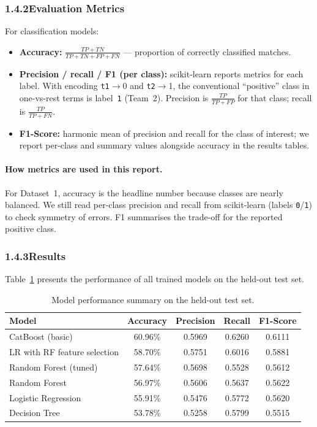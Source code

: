 \documentclass[12pt,a4paper]{article}
\begin{document}
\subsubsection{1.4.2\quad Evaluation Metrics}

For classification models:

\begin{itemize}[leftmargin=1.5em]
    \item \textbf{Accuracy:} $\frac{TP + TN}{TP + TN + FP + FN}$ --- proportion of correctly classified matches.
    \item \textbf{Precision / recall / F1 (per class):} scikit-learn reports metrics for each label. With encoding \texttt{t1}$\rightarrow$0 and \texttt{t2}$\rightarrow$1, the conventional ``positive'' class in one-vs-rest terms is label~\texttt{1} (Team~2). Precision is $\frac{TP}{TP+FP}$ for that class; recall is $\frac{TP}{TP+FN}$.
    \item \textbf{F1-Score:} harmonic mean of precision and recall for the class of interest; we report per-class and summary values alongside accuracy in the results tables.
\end{itemize}

\paragraph{How metrics are used in this report.}
For Dataset~1, accuracy is the headline number because classes are nearly balanced. We still read per-class precision and recall from scikit-learn (labels \texttt{0}/\texttt{1}) to check symmetry of errors. F1 summarises the trade-off for the reported positive class.

\subsubsection{1.4.3\quad Results}

Table~\ref{tab:results} presents the performance of all trained models on the held-out test set.

\begin{table}[H]
\centering
\caption{Model performance summary on the held-out test set.}
\label{tab:results}
\begin{tabular}{lcccc}
\toprule
\textbf{Model} & \textbf{Accuracy} & \textbf{Precision} & \textbf{Recall} & \textbf{F1-Score} \\
\midrule
CatBoost (basic)              & 60.96\%  & 0.5969 & 0.6260 & 0.6111 \\
LR with RF feature selection  & 58.70\%  & 0.5751 & 0.6016 & 0.5881 \\
Random Forest (tuned)         & 57.64\%  & 0.5698 & 0.5528 & 0.5612 \\
Random Forest                 & 56.97\%  & 0.5606 & 0.5637 & 0.5622 \\
Logistic Regression           & 55.91\%  & 0.5476 & 0.5772 & 0.5620 \\
Decision Tree                 & 53.78\%  & 0.5258 & 0.5799 & 0.5515 \\
\bottomrule
\end{tabular}
\end{table}
\end{document}
